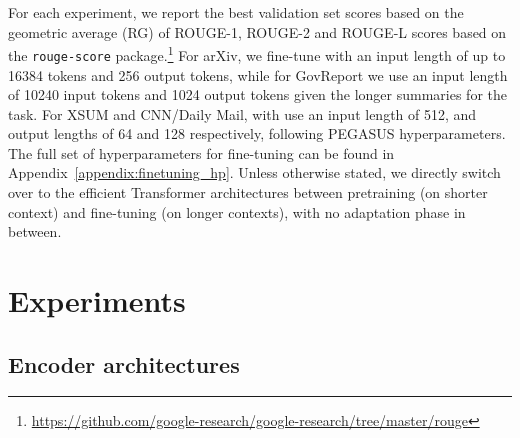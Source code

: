 \documentclass[11pt]{article}
\begin{document}
For each experiment, we report the best validation set scores based on the geometric average (RG) of ROUGE-1, ROUGE-2 and ROUGE-L scores \citep{lin2004rouge} based on the \texttt{rouge-score} package.\footnote{\url{https://github.com/google-research/google-research/tree/master/rouge}}
For arXiv, we fine-tune with an input length of up to 16384 tokens and 256 output tokens, while for GovReport we use an input length of 10240 input tokens and 1024 output tokens given the longer summaries for the task.
For XSUM and CNN/Daily Mail, with use an input length of 512, and output lengths of 64 and 128 respectively, following PEGASUS hyperparameters.
The full set of hyperparameters for fine-tuning can be found in Appendix~\ref{appendix:finetuning_hp}.
Unless otherwise stated, we directly switch over to the efficient Transformer architectures between pretraining (on shorter context) and fine-tuning (on longer contexts), with no adaptation phase in between.

\section{Experiments}

\subsection{Encoder architectures}

\label{section:ablation_encoder}
\end{document}
